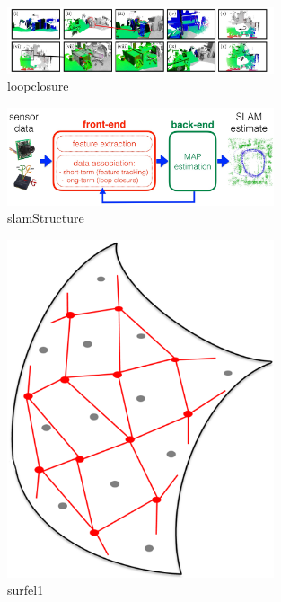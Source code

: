 \documentclass[12pt,twoside]{article}
\begin{document}
\begin{figure}[h]
    \centering
    \includegraphics[width=0.7\textwidth]{figures/loopclosure}
    \caption{loopclosure}
    \label{fig:loopclosure}
\end{figure}

\begin{figure}[h]
    \centering
    \includegraphics[width=0.7\textwidth]{figures/slamStructure}
    \caption{slamStructure}
    \label{fig:slamStructure}
\end{figure}

\begin{figure}[h]
    \centering
    \includegraphics[width=0.7\textwidth]{figures/surfel1}
    \caption{surfel1}
    \label{fig:surfel1}
\end{figure}
\end{document}
